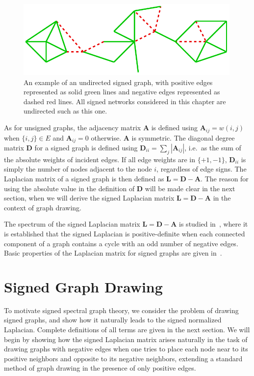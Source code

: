 \documentclass[11pt,a4paper]{book}
\newcommand{\wFull}{0.99}
\begin{document}
\begin{figure}[h!]
  \includegraphics[width=\wFull\textwidth]{img-pdf/graph-signed}
  \caption{
    An example of an undirected signed graph, with positive edges
    represented as solid green lines and negative edges
    represented as dashed red lines.  
    All signed networks considered in this chapter are undirected such
    as this one. 
  }
  \label{fig:synthetic-signed-graph}
\end{figure}

As for unsigned graphs, the adjacency matrix $\mathbf A$ is defined
using $\mathbf A_{ij} = w(i,j)$ when $\{i,j\}\in E$ and $\mathbf A_{ij} =
0$ otherwise. 
$\mathbf A$ is symmetric. 
The diagonal degree matrix $\mathbf D$ for a signed graph is defined
using $\mathbf D_{ii} = \sum_j |\mathbf A_{ij}|$, i.e.\ as the sum of
the absolute weights of incident edges.  If all edge weights are in
$\{+1, -1\}$, $\mathbf D_{ii}$ is simply the number of nodes adjacent to
the node $i$, regardless of edge signs.  
The Laplacian matrix of a signed graph is then defined as $\mathbf L =
\mathbf D - \mathbf A$. 
The reason for using the
absolute value in the definition of $\mathbf D$ will be made clear in the next
section, when we will derive the signed Laplacian matrix $\mathbf
L=\mathbf D-\mathbf A$ in the context
of graph drawing. 

The spectrum of the signed Laplacian matrix $\mathbf
L=\mathbf D-\mathbf A$ is studied in~\cite{b351}, where it
is established that the signed Laplacian is positive-definite when each
connected component of a graph contains a cycle with an odd number of
negative edges. 
Basic properties of the Laplacian matrix for signed graphs are given
in~\cite{b356}. 

\section{Signed Graph Drawing}
\label{sec:signed:drawing}
To motivate signed spectral graph theory, we consider the problem of
drawing signed graphs, and show how it naturally leads to the signed
normalized Laplacian.  Complete definitions of all terms are given in
the next section.  
We will begin by showing how the signed Laplacian matrix arises
naturally in the task of drawing graphs with negative edges when one
tries to place each node near to its positive neighbors and opposite to
its negative neighbors, extending a standard method of graph drawing in
the presence of only positive edges.  
\end{document}
